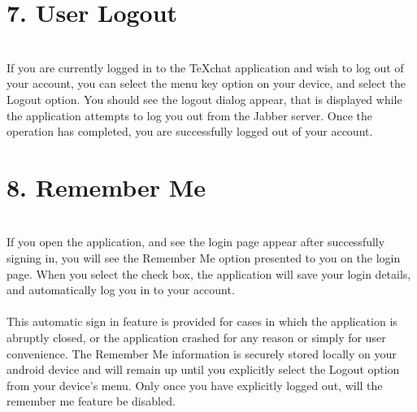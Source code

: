 \documentclass[29pt,a4paper]{moderncv}
\begin{document}
\newpage
		\section*{7. User Logout}
		\vspace{5mm}
		\\If you are currently logged in to the TeXchat application and wish to log out of your account, you can select the menu key option on your device, and select the Logout option.  You should see the logout dialog appear, that is displayed while the application attempts to log you out from the Jabber server.  Once the operation has completed, you are successfully logged out of your account.\\
		\vspace{4mm}
				
		\section*{8. Remember Me}
		\vspace{5mm}
		\\If you open the application, and see the login page appear after successfully signing in, you will see the Remember Me option presented to you on the login page.  When you select the check box, the application will save your login details, and automatically log you in to your account. \\ 
		
		\\This automatic sign in feature is provided for cases in which the application is abruptly closed, or the application crashed for any reason or simply for user convenience.  The Remember Me information is securely stored locally on your android device and will remain up until you explicitly select the Logout option from your device’s menu. Only once you have explicitly logged out, will the remember me feature be disabled.  \\
		
\end{document}
